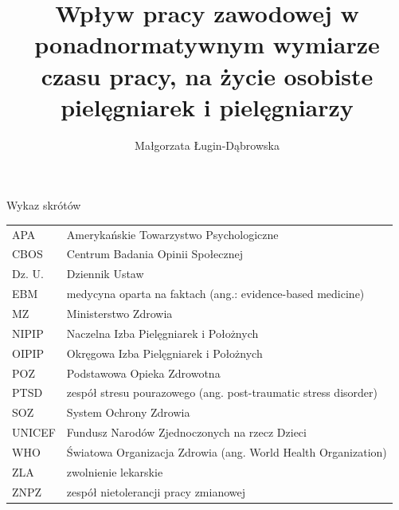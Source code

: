 \documentclass[a4paper,12pt,twoside,openright]{mwrep}
\title{Wpływ pracy zawodowej w ponadnormatywnym wymiarze czasu pracy, na życie osobiste pielęgniarek i pielęgniarzy}
\author{Małgorzata Ługin-Dąbrowska}
\newcommand{\nocontentsline}[3]{}
\newcommand{\tocless}[2]{\bgroup\let\addcontentsline=\nocontentsline#1{#2}\egroup}
\begin{document}
\sloppy
\maketitle


\tableofcontents


\newpage
\Large Wykaz skrótów
\normalsize



\begin{table}[ht]
    
    \label{tab:index}
	\begin{tabular}{  l  l  }
	
    APA & Amerykańskie Towarzystwo Psychologiczne 	\\
	
	CBOS & Centrum Badania Opinii Społecznej\\

	Dz. U. & Dziennik Ustaw\\

	EBM & medycyna oparta na faktach (ang.: evidence-based medicine)\\

	MZ & Ministerstwo Zdrowia\\

	NIPIP & Naczelna Izba Pielęgniarek i Położnych\\

	OIPIP & Okręgowa Izba Pielęgniarek i Położnych\\

	POZ & Podstawowa Opieka Zdrowotna\\

	PTSD & zespół stresu pourazowego (ang. post-traumatic stress disorder)\\

	SOZ & System Ochrony Zdrowia\\
	
	UNICEF & Fundusz Narodów Zjednoczonych na rzecz Dzieci\\

	WHO & Światowa Organizacja Zdrowia (ang. World Health Organization)\\
     
     ZLA & zwolnienie lekarskie \\

	ZNPZ & zespół nietolerancji pracy zmianowej \\
	

	
	\end{tabular}
   

\end{table}
\end{document}
